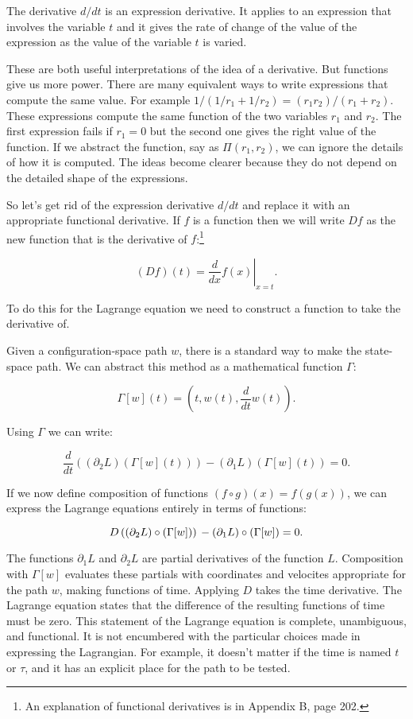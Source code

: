 \documentclass[11pt]{article}
\begin{document}
The derivative \(d/dt\) is an expression derivative. It applies to an expression
that involves the variable \(t\) and it gives the rate of change of the value of
the expression as the value of the variable \(t\) is varied.

These are both useful interpretations of the idea of a derivative. But functions
give us more power. There are many equivalent ways to write expressions that
compute the same value. For example \(1/(1/r_1 + 1/r_2)=(r_1r_2)/(r_1 + r_2)\).
These expressions compute the same function of the two variables \(r_1\) and
\(r_2\). The first expression fails if \(r_1 = 0\) but the second one gives the
right value of the function. If we abstract the function, say as \(\Pi(r_1,
r_2)\), we can ignore the details of how it is computed. The ideas become clearer
because they do not depend on the detailed shape of the expressions.

So let’s get rid of the expression derivative \(d/dt\) and replace it with an
appropriate functional derivative. If \(f\) is a function then we will write \(Df\)
as the new function that is the derivative of \(f\):\footnote{An explanation of functional derivatives is in Appendix B, page 202.}

$$(D f)(t)=\left.\frac{d}{d x} f(x)\right|_{x=t}.$$

To do this for the Lagrange equation we need to construct a function to take the
derivative of.

Given a configuration-space path \(w\), there is a standard way to make the
state-space path. We can abstract this method as a mathematical function
\(\Gamma\):

$$\Gamma[w](t)=\left(t, w(t), \frac{d}{d t} w(t)\right).$$

Using \(\Gamma\) we can write:

$$\frac{d}{dt}\left(\left(\partial_{2} L\right) \left(\Gamma[w](t)\right)
\right) - \left(\partial_{1} L\right) \left(\Gamma[w](t)\right)=0.$$

If we now define composition of functions \((f \circ g)(x) = f(g(x))\), we can
express the Lagrange equations entirely in terms of functions:

$$D\left(\left(\partial_{2} L\right) \circ \left(\Gamma[w]\right)\right)
\\ -\left(\partial_{1} L\right) \circ \left(\Gamma[w]\right)=0.$$

The functions \(\partial_1 L\) and \(\partial_2 L\) are partial derivatives of the
function \(L\). Composition with \(\Gamma[w]\) evaluates these partials with
coordinates and velocites appropriate for the path \(w\), making functions of
time. Applying \(D\) takes the time derivative. The Lagrange equation states that
the difference of the resulting functions of time must be zero. This statement
of the Lagrange equation is complete, unambiguous, and functional. It is not
encumbered with the particular choices made in expressing the Lagrangian. For
example, it doesn’t matter if the time is named \(t\) or \(\tau\), and it has an
explicit place for the path to be tested.
\end{document}
